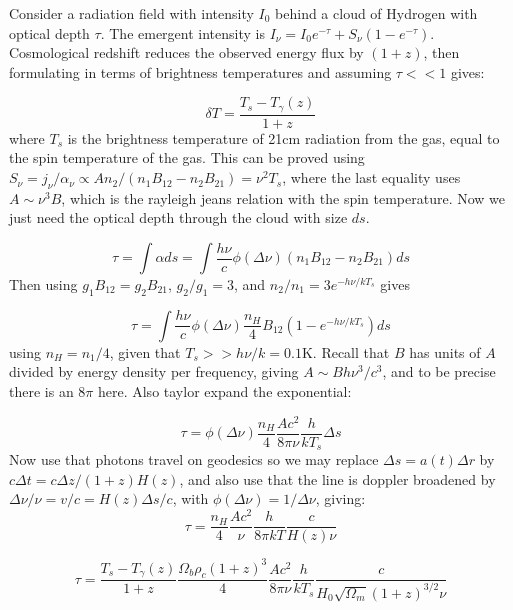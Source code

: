 Consider a radiation field with intensity $I_0$ behind a cloud of Hydrogen with optical depth $\tau$. The emergent intensity is $I_\nu=I_0e^{-\tau}+S_\nu(1-e^{-\tau})$. Cosmological redshift reduces the observed energy flux by $(1+z)$, then formulating in terms of brightness temperatures and assuming $\tau<<1$ gives:

\begin{equation}
\delta T=\frac{T_s-T_\gamma(z)}{1+z}
\end{equation}
where $T_s$ is the brightness temperature of 21cm radiation from the gas, equal to the spin temperature of the gas. This can be proved using $S_\nu=j_\nu/\alpha_\nu\propto A n_2/(n_1B_{12}-n_2B_{21})=\nu^2 T_s$, where the last equality uses $A\sim\nu^3B$, which is the rayleigh jeans relation with the spin temperature. Now we just need the optical depth through the cloud with size $ds$.

\begin{equation}
\tau=\int\alpha ds=\int\frac{h\nu}{c}\phi(\Delta\nu)(n_1B_{12}-n_2B_{21})ds
\end{equation}
Then using $g_1B_{12}=g_2B_{21}$, $g_2/g_1=3$, and $n_2/n_1=3e^{-h\nu/kT_s}$ gives

\begin{equation}
\tau=\int\frac{h\nu}{c}\phi(\Delta\nu)\frac{n_H}{4}B_{12}(1-e^{-h\nu/kT_s})ds
\end{equation}
using $n_H=n_1/4$, given that $T_s>>h\nu/k=0.1$K. Recall that $B$ has units of $A$ divided by energy density per frequency, giving $A\sim Bh\nu^3/c^3$, and to be precise there is an $8\pi$ here. Also taylor expand the exponential:

\begin{equation}
\tau=\phi(\Delta\nu)\frac{n_H}{4}\frac{Ac^2}{8\pi\nu}\frac{h}{kT_s}\Delta s
\end{equation}
Now use that photons travel on geodesics so we may replace $\Delta s=a(t)\Delta r$ by $c\Delta t=c\Delta z/(1+z)H(z)$, and also use that the line is doppler broadened by $\Delta\nu/\nu=v/c=H(z)\Delta s/c$, with $\phi(\Delta\nu)=1/\Delta \nu$, giving:
\begin{equation}
\tau=\frac{n_H}{4}\frac{Ac^2}{\nu}\frac{h}{8\pi kT}\frac{c}{H(z)\nu}
\end{equation}

\begin{equation}
\tau=\frac{T_s-T_\gamma(z)}{1+z}\frac{\Omega_b\rho_c(1+z)^3}{4}\frac{Ac^2}{8\pi\nu}\frac{h}{kT_s}\frac{c}{H_0\sqrt{\Omega_m}(1+z)^{3/2}\nu}
\end{equation}

